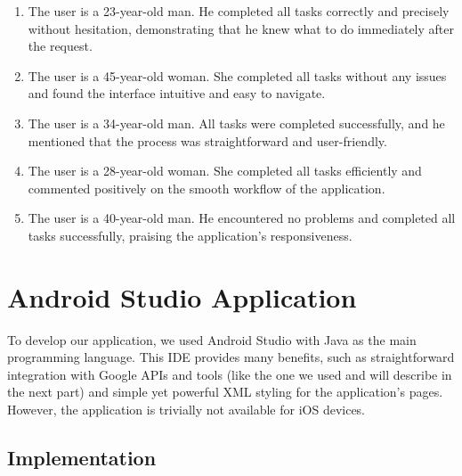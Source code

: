 \documentclass[12pt]{article}
\begin{document}
\begin{enumerate}
    \item The user is a 23-year-old man. He completed all tasks 
    correctly and precisely without hesitation, demonstrating that he knew 
    what to do immediately after the request.

    \item The user is a 45-year-old woman. She completed all tasks 
    without any issues and found the interface intuitive and easy to navigate.

    \item The user is a 34-year-old man. All tasks were completed successfully, and he mentioned that the process was straightforward and user-friendly.

    \item The user is a 28-year-old woman. She completed all tasks 
    efficiently and commented positively on the smooth workflow of the application.

    \item The user is a 40-year-old man. He encountered no problems and completed all tasks successfully, praising the application's responsiveness.
\end{enumerate}

\section{Android Studio Application}
To develop our application, we used Android Studio with Java as the main 
programming language. This IDE provides many benefits, such as 
straightforward integration with Google APIs and tools 
(like the one we used and will describe in the next part) and simple yet 
powerful XML styling for the application's pages. However, the application 
is trivially not available for iOS devices. 

\subsection{Implementation}
\end{document}
